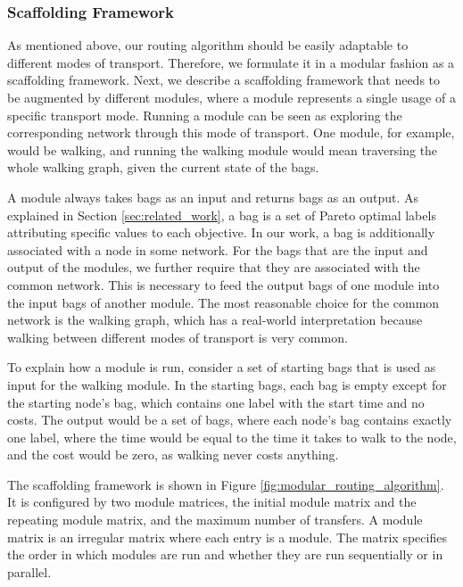 \subsubsection{Scaffolding Framework}
\label{subsubsec:algorithm}

As mentioned above, our routing algorithm should be easily adaptable to different modes of transport. Therefore, we formulate it in a modular fashion as a scaffolding framework.
Next, we describe a scaffolding framework that needs to be augmented by different modules, where a module represents a single usage of a specific transport mode. Running a module can be seen as exploring the corresponding network through this mode of transport.
One module, for example, would be walking, and running the walking module would mean traversing the whole walking graph, given the current state of the bags.

A module always takes bags as an input and returns bags as an output.
As explained in Section \ref{sec:related_work}, a bag is a set of Pareto optimal labels attributing specific values to each objective.
In our work, a bag is additionally associated with a node in some network.
For the bags that are the input and output of the modules, we further require that they are associated with the common network.
This is necessary to feed the output bags of one module into the input bags of another module.
The most reasonable choice for the common network is the walking graph, which has a real-world interpretation because walking between different modes of transport is very common.

To explain how a module is run, consider a set of starting bags that is used as input for the walking module.
In the starting bags, each bag is empty except for the starting node's bag, which contains one label with the start time and no costs.
The output would be a set of bags, where each node's bag contains exactly one label, where the time would be equal to the time it takes to walk to the node, and the cost would be zero, as walking never costs anything.

The scaffolding framework is shown in Figure \ref{fig:modular_routing_algorithm}.
It is configured by two module matrices, the initial module matrix and the repeating module matrix, and the maximum number of transfers.
A module matrix is an irregular matrix where each entry is a module.
The matrix specifies the order in which modules are run and whether they are run sequentially or in parallel.

